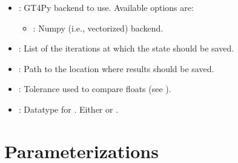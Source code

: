 \documentclass[letterpaper,10pt,english]{sphinxmanual}
\begin{document}
\begin{description}
\begin{itemize}
\item {} 
: GT4Py backend to use. Available options are:
\begin{itemize}
\item {} 
: Numpy (i.e., vectorized) backend.

\end{itemize}

\item {} 
: List of the iterations at which the state should be saved.

\item {} 
: Path to the location where results should be saved.

\item {} 
: Tolerance used to compare floats (see ).

\item {} 
: Datatype for . Either  or .

\end{itemize}

\end{description}


\section{Parameterizations}
\label{\detokenize{api:parameterizations}}
\end{document}
